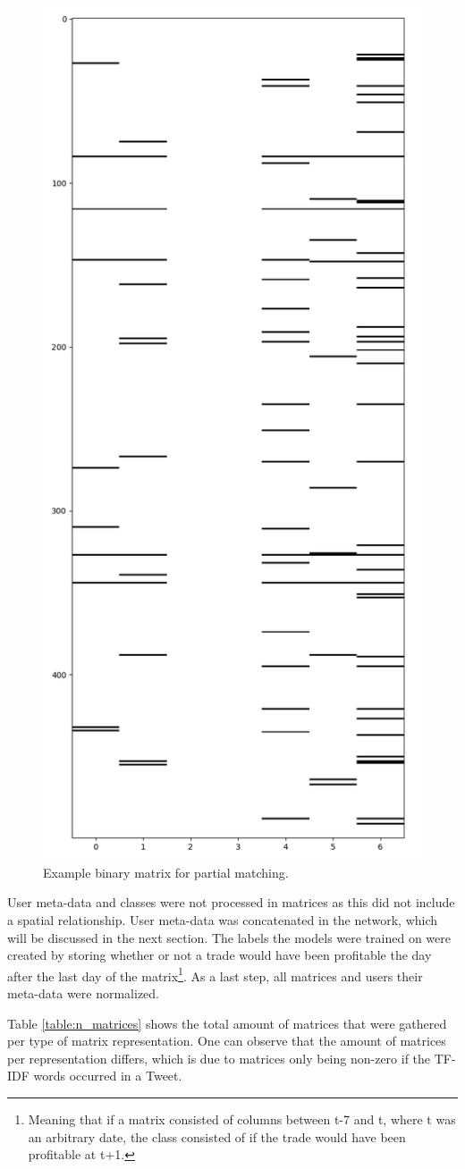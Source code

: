 \documentclass[sigconf]{acmart-txmm}
\begin{document}
\begin{figure}[H]
  \centering
  \includegraphics[width=0.5\linewidth]{report/img/binary_train_0_28500.png}
  \caption{Example binary matrix for partial matching.}
  \label{fig:ex_matrix}
\end{figure}

User meta-data and classes were not processed in matrices as this did not include a spatial relationship. User meta-data was concatenated in the network, which will be discussed in the next section. The labels the models were trained on were created by storing whether or not a trade would have been profitable the day after the last day of the matrix\footnote{Meaning that if a matrix consisted of columns between t-7 and t, where t was an arbitrary date, the class consisted of if the trade would have been profitable at t+1.}. As a last step, all matrices and users their meta-data were normalized.

Table \ref{table:n_matrices} shows the total amount of matrices that were gathered per type of matrix representation. One can observe that the amount of matrices per representation differs, which is due to matrices only being non-zero if the TF-IDF words occurred in a Tweet.
\end{document}
